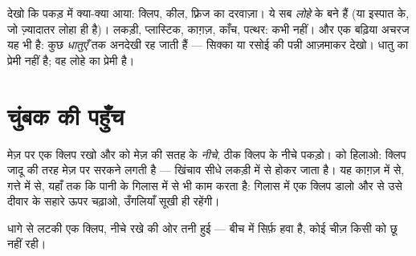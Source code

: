 \begin{example}[चुंबक की पसंदीदा धातु]\label{ex:g1:magnets:iron}
देखो कि पकड़ में क्या-क्या आया: क्लिप, कील, फ़्रिज का दरवाज़ा। ये सब
\emph{लोहे} के बने हैं (या इस्पात के, जो ज़्यादातर लोहा ही है)।
लकड़ी, प्लास्टिक, काग़ज़, काँच, पत्थर: कभी नहीं। और एक बढ़िया अचरज यह
भी है: कुछ \emph{धातुएँ} तक अनदेखी रह जाती हैं --- सिक्का या रसोई की
पन्नी आज़माकर देखो।  धातु का प्रेमी नहीं है; वह लोहे का प्रेमी
है।
\end{example}

\section{चुंबक की पहुँच}

\begin{example}\label{ex:g1:magnets:through}
मेज़ पर एक क्लिप रखो और  को मेज़ की सतह के \emph{नीचे}, ठीक
क्लिप के नीचे पकड़ो।  को हिलाओ: क्लिप जादू की तरह मेज़ पर सरकने
लगती है --- खिंचाव सीधे लकड़ी में से होकर जाता है। यह काग़ज़ में से,
गत्ते में से, यहाँ तक कि पानी के गिलास में से भी काम करता है: गिलास
में एक क्लिप डालो और  से उसे दीवार के सहारे ऊपर चढ़ाओ, उँगलियाँ
सूखी ही रहेंगी।
\end{example}

\begin{omfigure}

{\small धागे से लटकी एक क्लिप, नीचे रखे  की ओर तनी हुई --- बीच
में सिर्फ़ हवा है, कोई चीज़ किसी को छू नहीं रही।}
\end{omfigure}

